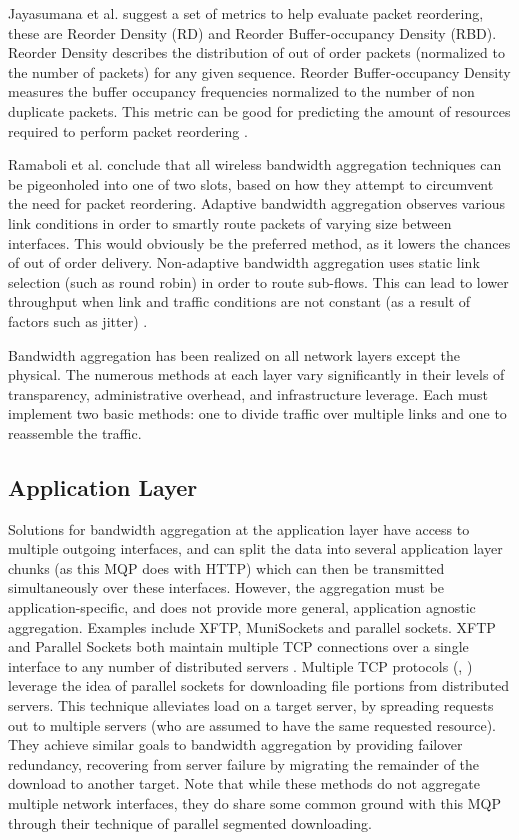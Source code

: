 \documentclass[12pt]{article}
\begin{document}
	Jayasumana et al. suggest a set of metrics to help evaluate packet reordering, these are Reorder Density (RD) and Reorder Buffer-occupancy Density (RBD). Reorder Density describes the distribution of out of order packets (normalized to the number of packets) for any given sequence. Reorder Buffer-occupancy Density measures the buffer occupancy frequencies normalized to the number of non duplicate packets. This metric can be good for predicting the amount of resources required to perform packet reordering \cite{rfc5236}.

	Ramaboli et al. conclude that all wireless bandwidth aggregation techniques can be pigeonholed into one of two slots, based on how they attempt to circumvent the need for packet reordering. Adaptive bandwidth aggregation observes various link conditions in order to smartly route packets of varying size between interfaces. This would obviously be the preferred method, as it lowers the chances of out of order delivery. Non-adaptive bandwidth aggregation uses static link selection (such as round robin) in order to route sub-flows. This can lead to lower throughput when link and traffic conditions are not constant (as a result of factors such as jitter) \cite{Ramaboli20121674}.

	Bandwidth aggregation has been realized on all network layers except the physical. The numerous methods at each layer vary significantly in their levels of transparency, administrative overhead, and infrastructure leverage. Each must implement two basic methods: one to divide traffic over multiple links and one to reassemble the traffic.

	\subsection{Application Layer}

		Solutions for bandwidth aggregation at the application layer have access to multiple outgoing interfaces, and can split the data into several application layer chunks (as this MQP does with HTTP) which can then be transmitted simultaneously over these interfaces. However, the aggregation must be application-specific, and does not provide more general, application agnostic aggregation. Examples include XFTP, MuniSockets and parallel sockets. XFTP and Parallel Sockets both maintain multiple TCP connections over a single interface to any number of distributed servers \cite{Ramaboli20121674}. Multiple TCP protocols (\cite{1541208}, \cite{4539690}) leverage the idea of parallel sockets for downloading file portions from distributed servers. This technique alleviates load on a target server, by spreading requests out to multiple servers (who are assumed to have the same requested resource). They achieve similar goals to bandwidth aggregation by providing failover redundancy, recovering from server failure by migrating the remainder of the download to another target. Note that while these methods do not aggregate multiple network interfaces, they do share some common ground with this MQP through their technique of parallel segmented downloading.
\end{document}
